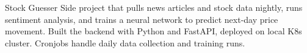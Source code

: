 
\begin{cventries}
    \cventry 
        {}
        {Stock Guesser}
        {}
        {}
        {
            Side project that pulls news articles and stock data nightly, runs sentiment analysis, and trains a neural network to predict next-day price movement. Built the backend with Python and FastAPI, deployed on local K8s cluster. Cronjobs handle daily data collection and training runs.
        }
    
\end{cventries}